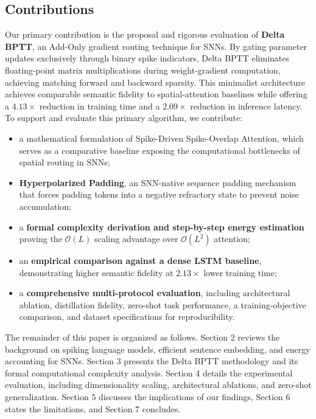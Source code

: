 \documentclass[runningheads]{llncs}
\begin{document}
\subsection{Contributions}
Our primary contribution is the proposal and rigorous evaluation of \textbf{Delta BPTT}, an Add-Only gradient routing technique for SNNs. By gating parameter updates exclusively through binary spike indicators, Delta BPTT eliminates floating-point matrix multiplications during weight-gradient computation, achieving matching forward and backward sparsity. This minimalist architecture achieves comparable semantic fidelity to spatial-attention baselines while offering a $4.13\times$ reduction in training time and a $2.09\times$ reduction in inference latency. To support and evaluate this primary algorithm, we contribute:
\begin{itemize}
    \item a mathematical formulation of Spike-Driven Spike-Overlap Attention, which serves as a comparative baseline exposing the computational bottlenecks of spatial routing in SNNs;
    \item \textbf{Hyperpolarized Padding}, an SNN-native sequence padding mechanism that forces padding tokens into a negative refractory state to prevent noise accumulation;
    \item a \textbf{formal complexity derivation and step-by-step energy estimation} proving the $\mathcal{O}(L)$ scaling advantage over $\mathcal{O}(L^2)$ attention;
    \item an \textbf{empirical comparison against a dense LSTM baseline}, demonstrating higher semantic fidelity at $2.13\times$ lower training time;
    \item a \textbf{comprehensive multi-protocol evaluation}, including architectural ablation, distillation fidelity, zero-shot task performance, a training-objective comparison, and dataset specifications for reproducibility.
\end{itemize}

The remainder of this paper is organized as follows. Section 2 reviews the background on spiking language models, efficient sentence embedding, and energy accounting for SNNs. Section 3 presents the Delta BPTT methodology and its formal computational complexity analysis. Section 4 details the experimental evaluation, including dimensionality scaling, architectural ablations, and zero-shot generalization. Section 5 discusses the implications of our findings, Section 6 states the limitations, and Section 7 concludes.
\end{document}
